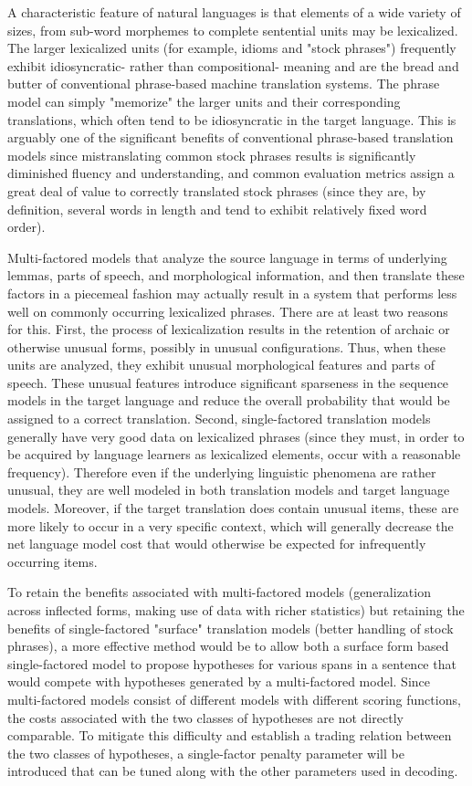 \documentclass[11pt]{book}
\theoremstyle{plain}
\begin{document}
A characteristic feature of natural languages is that elements of a
wide variety of sizes, from sub-word morphemes to complete
sentential units may be lexicalized.  The larger lexicalized units
(for example, idioms and "stock phrases") frequently exhibit
idiosyncratic- rather than compositional- meaning and are the bread
and butter of conventional phrase-based machine translation systems.
The phrase model can simply "memorize" the larger units and their
corresponding translations, which often tend to be idiosyncratic in
the target language.  This is arguably one of the significant
benefits of conventional phrase-based translation models since
mistranslating common stock phrases results is significantly
diminished fluency and understanding, and common evaluation metrics
assign a great deal of value to correctly translated stock phrases
(since they are, by definition, several words in length and tend to
exhibit relatively fixed word order).

Multi-factored models that analyze the source language in terms of
underlying lemmas, parts of speech, and morphological information,
and then translate these factors in a piecemeal fashion may actually
result in a system that performs less well on commonly occurring
lexicalized phrases. There are at least two reasons for this. First,
the process of lexicalization results in the retention of archaic or
otherwise unusual forms, possibly in unusual configurations.  Thus,
when these units are analyzed, they exhibit unusual morphological
features and parts of speech.  These unusual features introduce
significant sparseness in the sequence models in the target language
and reduce the overall probability that would be assigned to a
correct translation.  Second, single-factored translation models
generally have very good data on lexicalized phrases (since they
must, in order to be acquired by language learners as lexicalized
elements, occur with a reasonable frequency).  Therefore even if the
underlying linguistic phenomena are rather unusual, they are well
modeled in both translation models and target language models.
Moreover, if the target translation does contain unusual items,
these are more likely to occur in a very specific context, which
will generally decrease the net language model cost that would
otherwise be expected for infrequently occurring items.

To retain the benefits associated with multi-factored models
(generalization across inflected forms, making use of data with
richer statistics) but retaining the benefits of single-factored
"surface" translation models (better handling of stock phrases), a
more effective method would be to allow both a surface form based
single-factored model to propose hypotheses for various spans in a
sentence that would compete with hypotheses generated by a
multi-factored model.  Since multi-factored models consist of
different models with different scoring functions, the costs
associated with the two classes of hypotheses are not directly
comparable.  To mitigate this difficulty and establish a trading
relation between the two classes of hypotheses, a single-factor
penalty parameter will be introduced that can be tuned along with
the other parameters used in decoding.
\end{document}
